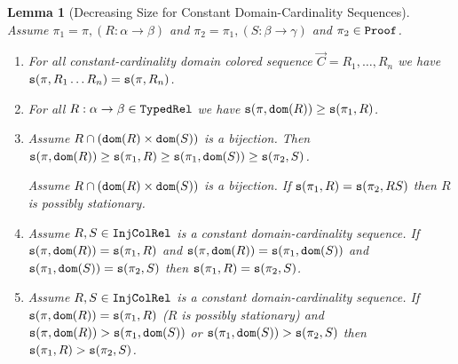 \documentclass{lmcs}
\newtheorem{lemma}[theorem]{Lemma}
\begin{document}

\begin{lemma}[Decreasing Size for Constant Domain-Cardinality Sequences]
\label{lemma-decreasing-size-constant}
Assume $\pi_1 = \pi, (R:\alpha \rightarrow \beta)$ and 
$\pi_2 = \pi_1, (S:\beta \rightarrow \gamma) $ and $\pi_2 \in {\tt Proof}$.
\begin{enumerate}
\item
\label{lemma-decreasing-size-constant-01}
For all constant-cardinality domain colored sequence 
$\vec{C} = R_1, \ldots, R_n$ we have ${\tt s}(\pi,R_1 \ldots R_n) = {\tt s}(\pi,R_{n})$.

\item
\label{lemma-decreasing-size-constant-02}
For all $R:\alpha \rightarrow \beta \in {\tt TypedRel}$ we have 
${\tt s}(\pi,{\tt dom}(R)) \ge {\tt s}(\pi_1,R)$.
 
\item
\label{lemma-decreasing-size-constant-03}
Assume $R \cap ({\tt dom}(R) \times {\tt dom}(S))$ is a bijection.
Then ${\tt s}(\pi,{\tt dom}(R)) \ge {\tt s}(\pi_1, R) \ge {\tt s}(\pi_1,{\tt dom}(S)) \ge {\tt s}(\pi_2,S)$.

\label{lemma-decreasing-size-constant-03bis}
Assume $R \cap ({\tt dom}(R) \times {\tt dom}(S))$ is a bijection.
If ${\tt s}(\pi_1,R) = {\tt s}(\pi_2,RS)$ then $R$ is possibly stationary.

\item
\label{lemma-decreasing-size-constant-04}
Assume $R,S \in {\tt InjColRel}$ is a constant domain-cardinality  sequence.
If ${\tt s}(\pi,{\tt dom}(R)) = {\tt s}(\pi_1,R)$ and ${\tt s}(\pi,{\tt dom}(R)) = {\tt s}(\pi_1,{\tt dom}(S))$
and ${\tt s}(\pi_1,{\tt dom}(S)) = {\tt s}(\pi_2,S)$ then ${\tt s}(\pi_1,R) = {\tt s}(\pi_2,S)$.

\item
\label{lemma-decreasing-size-constant-05}
Assume $R,S \in {\tt InjColRel}$ is a constant domain-cardinality sequence.
If ${\tt s}(\pi,{\tt dom}(R)) = {\tt s}(\pi_1,R)$ ($R$ is possibly stationary) 
and ${\tt s}(\pi,{\tt dom}(R)) >{\tt s}(\pi_1,{\tt dom}(S))$
or ${\tt s}(\pi_1,{\tt dom}(S)) > {\tt s}(\pi_2,S)$ then ${\tt s}(\pi_1,R) > {\tt s}(\pi_2,S)$.

%
%
\end{enumerate}
\end{lemma}
\end{document}
